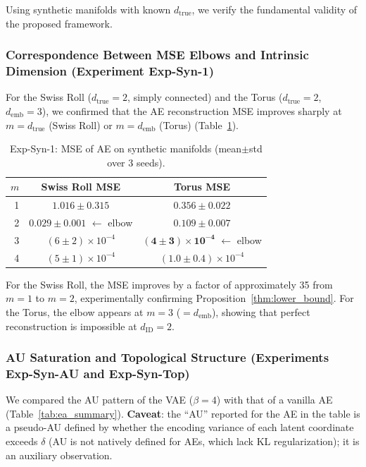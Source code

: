 \documentclass[make,article,submit,pdftex,moreauthors]{Definitions/mdpi}
\newcommand{\dID}{d_{\mathrm{ID}}}
\newcommand{\dtrue}{d_{\mathrm{true}}}
\newcommand{\demb}{d_{\mathrm{emb}}}
\begin{document}
Using synthetic manifolds with known $\dtrue$, we verify the fundamental validity of the proposed framework.

\subsubsection{Correspondence Between MSE Elbows and Intrinsic Dimension (Experiment Exp-Syn-1)}

For the Swiss Roll ($\dtrue = 2$, simply connected) and the Torus ($\dtrue = 2$, $\demb = 3$),
we confirmed that the AE reconstruction MSE improves sharply at $m = \dtrue$ (Swiss Roll) or $m = \demb$ (Torus)
(Table~\ref{tab:e1}).

\begin{table}[H]
\centering
\caption{Exp-Syn-1: MSE of AE on synthetic manifolds (mean$\pm$std over 3 seeds).}
\label{tab:e1}
\small
\begin{tabular}{rcc}
\toprule
$m$ & Swiss Roll MSE & Torus MSE \\
\midrule
1 & $1.016\pm0.315$ & $0.356\pm0.022$ \\
2 & $\boldsymbol{0.029\pm0.001}$ $\leftarrow$ elbow & $0.109\pm0.007$ \\
3 & $(6\pm2)\times10^{-4}$ & $\boldsymbol{(4\pm3)\times10^{-4}}$ $\leftarrow$ elbow \\
4 & $(5\pm1)\times10^{-4}$ & $(1.0\pm0.4)\times10^{-4}$ \\
\bottomrule
\end{tabular}
\end{table}

For the Swiss Roll, the MSE improves by a factor of approximately 35 from $m = 1$ to $m = 2$,
experimentally confirming Proposition~\ref{thm:lower_bound}.
For the Torus, the elbow appears at $m = 3$ ($= \demb$),
showing that perfect reconstruction is impossible at $\dID = 2$.

\subsubsection{AU Saturation and Topological Structure (Experiments Exp-Syn-AU and Exp-Syn-Top)}

We compared the AU pattern of the VAE ($\beta = 4$) with that of a vanilla AE (Table~\ref{tab:ea_summary}).
\textbf{Caveat}: the ``AU'' reported for the AE in the table is a pseudo-AU defined by
whether the encoding variance of each latent coordinate exceeds $\delta$
(AU is not natively defined for AEs, which lack KL regularization); it is an
auxiliary observation.
\end{document}
